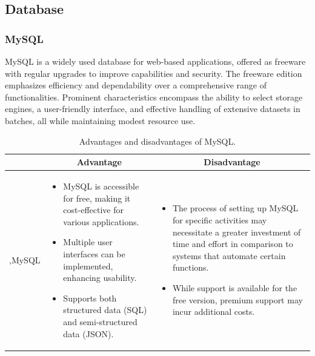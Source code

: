 \newpage
\subsection{Database}

\subsubsection{MySQL}

MySQL is a widely used database for web-based applications, offered as freeware with regular upgrades to improve capabilities and security. The freeware edition emphasizes efficiency and dependability over a comprehensive range of functionalities. Prominent characteristics encompass the ability to select storage engines, a user-friendly interface, and effective handling of extensive datasets in batches, all while maintaining modest resource use.

\begin{table}[H]
    \centering
    \begin{tabular}{| c | p{} | p{} |}
        \hline
        \multicolumn{1}{|c|}{}
        & \multicolumn{1}{c|}{Advantage}
        & \multicolumn{1}{c|}{Disadvantage} \\ \hline
        \multirow{7}{*}{,MySQL}     
                &   \begin{itemize}[leftmargin=*,topsep=0pt,partopsep=0pt,parsep=0pt]
                        \item MySQL is accessible for free, making it cost-effective for various applications.
                        \item Multiple user interfaces can be implemented, enhancing usability.
                        \item Supports both structured data (SQL) and semi-structured data (JSON).
                    \end{itemize}
                &   \begin{itemize}[leftmargin=*,topsep=0pt,partopsep=0pt,parsep=0pt]
                        \item The process of setting up MySQL for specific activities may necessitate a greater investment of time and effort in comparison to systems that automate certain functions.
                        \item While support is available for the free version, premium support may incur additional costs.
                    \end{itemize} \\ \hline
    \end{tabular}
    \caption{Advantages and disadvantages of MySQL.}
\end{table}

